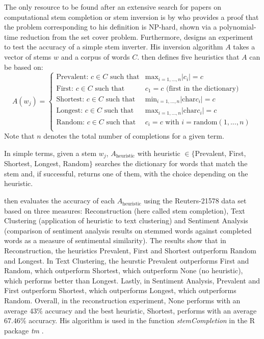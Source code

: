 \documentclass[11pt]{article}
\begin{document}
The only resource to be found after an extensive search for papers on computational stem completion or stem inversion is by \cite{Feinerer2010} who provides a proof that the problem corresponding to his definition is NP-hard, shown via a polynomial-time reduction from the set cover problem. Furthermore, \cite{Feinerer2010} designs an experiment to test the accuracy of a simple stem inverter. His inversion algorithm $A$ takes a vector of stems $w$ and a corpus of words $C$. \cite{Feinerer2010} then defines five heuristics that $A$ can be based on: 
\[ A(w_j)=
\begin{cases} 
    \mbox{Prevalent: }c\in C \mbox{ such that} & \mbox{max}_{i=1,...,n}\vert c_i\vert = c \\
    \mbox{First: }c\in C \mbox{ such that} & c_1 = c \mbox{ (first in the dictionary)} \\
    \mbox{Shortest: }c\in C \mbox{ such that} & \mbox{min}_{i=1,...,n}\vert \mbox{char}c_i\vert = c \\
    \mbox{Longest: }c\in C \mbox{ such that} & \mbox{max}_{i=1,...,n}\vert \mbox{char}c_i\vert = c \\
    \mbox{Random: }c\in C \mbox{ such that} & c_i = c \mbox{ with } i = \mbox{random}(1,...,n)\\
\end{cases}
\]
Note that $n$ denotes the total number of completions for a given term.

In simple terms, given a stem $w_j$, $A_{\mbox{heuristic}}$ with heuristic $\in \{$Prevalent, First, Shortest, Longest, Random$\}$ searches the dictionary for words that match the stem and, if successful, returns one of them, with the choice depending on the heuristic. 

\cite{Feinerer2010} then evaluates the accuracy of each $A_{\mbox{heuristic}}$ using the Reuters-21578 data set \citep{ReutersDataset} based on three measures: Reconstruction (here called stem completion), Text Clustering (application of heuristic to text clustering) and Sentiment Analysis (comparison of sentiment analysis results on stemmed words against completed words as a measure of sentimental similarity). The results show that in Reconstruction, the heuristics Prevalent, First and Shortest outperform Random and Longest. In Text Clustering, the heurstic Prevalent outperforms First and Random, which outperform Shortest, which outperform None (no heuristic), which performs better than Longest. Lastly, in Sentiment Analysis, Prevalent and First outperform Shortest, which outperforms Longest, which outperforms Random. Overall, in the reconstruction experiment, None performs with an average 43\% accuracy and the best heuristic, Shortest, performs with an average 67.46\% accuracy. His algorithm is used in the function \textit{stemCompletion} in the R package \textit{tm} \citep{stemcompletionpackage}.
\end{document}
